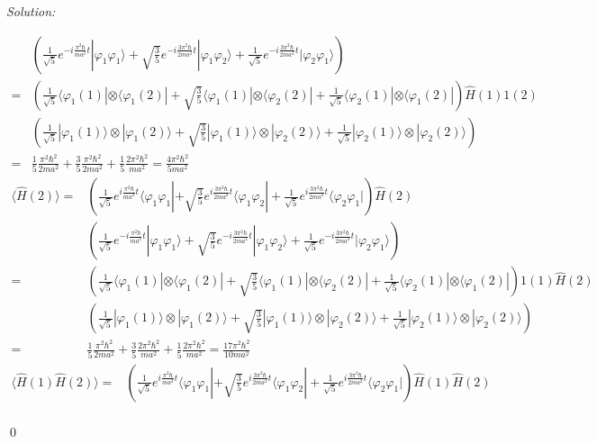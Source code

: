 \documentclass[12pt,a4paper]{article}
\newenvironment{sol}
    {\emph{Solution:}
    }
    {
    \qed
    }
\begin{document}
\begin{sol}
\begin{itemize}
\begin{itemize}
\begin{align}
\nonumber&\left(\frac{1}{\sqrt{5}}e^{-i\frac{\pi^2\hbar}{ma^2}t}|\varphi_1\varphi_1\rangle+\sqrt{\frac{3}{5}}e^{-i\frac{3\pi^2\hbar}{2ma^2}t}|\varphi_1\varphi_2\rangle+\frac{1}{\sqrt{5}}e^{-i\frac{3\pi^2\hbar}{2ma^2}t}|\varphi_2\varphi_1\rangle\right)\\
\nonumber=&\left(\frac{1}{\sqrt{5}}\langle\varphi_1(1)|\otimes\langle\varphi_1(2)|+\sqrt{\frac{3}{5}}\langle\varphi_1(1)|\otimes\langle\varphi_2(2)|+\frac{1}{\sqrt{5}}\langle\varphi_2(1)|\otimes\langle\varphi_1(2)|\right)\hat{H}(1)1(2)\\
\nonumber&\left(\frac{1}{\sqrt{5}}|\varphi_1(1)\rangle\otimes|\varphi_1(2)\rangle+\sqrt{\frac{3}{5}}|\varphi_1(1)\rangle\otimes|\varphi_2(2)\rangle+\frac{1}{\sqrt{5}}|\varphi_2(1)\rangle\otimes|\varphi_2(2)\rangle\right)\\
=&\frac{1}{5}\frac{\pi^2\hbar^2}{2ma^2}+\frac{3}{5}\frac{\pi^2\hbar^2}{2ma^2}+\frac{1}{5}\frac{2\pi^2\hbar^2}{ma^2}=\frac{4\pi^2\hbar^2}{5ma^2}
\end{align}
\begin{align}
\nonumber\langle\hat{H}(2)\rangle=&\left(\frac{1}{\sqrt{5}}e^{i\frac{\pi^2\hbar}{ma^2}t}\langle\varphi_1\varphi_1|+\sqrt{\frac{3}{5}}e^{i\frac{3\pi^2\hbar}{2ma^2}t}\langle\varphi_1\varphi_2|+\frac{1}{\sqrt{5}}e^{i\frac{3\pi^2\hbar}{2ma^2}t}\langle\varphi_2\varphi_1|\right)\hat{H}(2)\\
\nonumber&\left(\frac{1}{\sqrt{5}}e^{-i\frac{\pi^2\hbar}{ma^2}t}|\varphi_1\varphi_1\rangle+\sqrt{\frac{3}{5}}e^{-i\frac{3\pi^2\hbar}{2ma^2}t}|\varphi_1\varphi_2\rangle+\frac{1}{\sqrt{5}}e^{-i\frac{3\pi^2\hbar}{2ma^2}t}|\varphi_2\varphi_1\rangle\right)\\
\nonumber=&\left(\frac{1}{\sqrt{5}}\langle\varphi_1(1)|\otimes\langle\varphi_1(2)|+\sqrt{\frac{3}{5}}\langle\varphi_1(1)|\otimes\langle\varphi_2(2)|+\frac{1}{\sqrt{5}}\langle\varphi_2(1)|\otimes\langle\varphi_1(2)|\right)1(1)\hat{H}(2)\\
\nonumber&\left(\frac{1}{\sqrt{5}}|\varphi_1(1)\rangle\otimes|\varphi_1(2)\rangle+\sqrt{\frac{3}{5}}|\varphi_1(1)\rangle\otimes|\varphi_2(2)\rangle+\frac{1}{\sqrt{5}}|\varphi_2(1)\rangle\otimes|\varphi_2(2)\rangle\right)\\
=&\frac{1}{5}\frac{\pi^2\hbar^2}{2ma^2}+\frac{3}{5}\frac{2\pi^2\hbar^2}{ma^2}+\frac{1}{5}\frac{2\pi^2\hbar^2}{ma^2}=\frac{17\pi^2\hbar^2}{10ma^2}
\end{align}
\begin{align}
\nonumber\langle\hat{H}(1)\hat{H}(2)\rangle=&\left(\frac{1}{\sqrt{5}}e^{i\frac{\pi^2\hbar}{ma^2}t}\langle\varphi_1\varphi_1|+\sqrt{\frac{3}{5}}e^{i\frac{3\pi^2\hbar}{2ma^2}t}\langle\varphi_1\varphi_2|+\frac{1}{\sqrt{5}}e^{i\frac{3\pi^2\hbar}{2ma^2}t}\langle\varphi_2\varphi_1|\right)\hat{H}(1)\hat{H}(2)\\

\end{align}
\end{itemize}
\end{itemize}
\end{sol}
\end{document}

